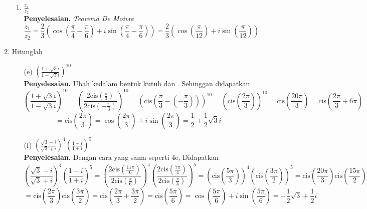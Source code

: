 \documentclass{article}
\begin{document}
\begin{enumerate}
\begin{enumerate}
        \item $\frac{z_1}{z_2}$\\
        \textbf{Penyelesaian. } \textit{Teorema De Moivre} 
        \[\frac{z_1}{z_2}=\frac{2}{3}\left(\cos{\left(\frac{\pi}{4}-\frac{\pi}{6}\right)}+i\sin{\left(\frac{\pi}{4}-\frac{\pi}{6}\right)}\right)=\frac{2}{3}\left(\cos{\left(\frac{\pi}{12}\right)}+i\sin{\left(\frac{\pi}{12}\right)}\right)\]
    \end{enumerate}

    \item Hitunglah
    \begin{enumerate}
        \item[(e)]$\left(\frac{1+\sqrt{3}i}{1-\sqrt{3}i}\right)^{10}$\\
        \textbf{Penyelesaian. } Ubah kedalam bentuk kutub   dan
        . Sehinggan didapatkan
        \[\left(\frac{1+\sqrt{3}i}{1-\sqrt{3}i}\right)^{10}=\left(\frac{2\textrm{cis}\left(\frac{\pi}{3}\right)}{2\textrm{cis}\left(-\frac{\pi}{3}\right)}\right)^{10}=\left(\textrm{cis}\left(\frac{\pi}{3}-\left(-\frac{\pi}{3}\right)\right)\right)^{10}=\left(\textrm{cis}\left(\frac{2\pi}{3}\right)\right)^{10}=\textrm{cis}\left(\frac{20\pi}{3}\right)=\textrm{cis}\left(\frac{2\pi}{3}+6\pi\right)\]
        \[=\textrm{cis}\left(\frac{2\pi}{3}\right)=\cos\left(\frac{2\pi}{3}\right)+i\sin\left(\frac{2\pi}{3}\right)=\frac{1}{2}+\frac{1}{2}\sqrt{3}i\]
        \item[(f)] $\left(\frac{\sqrt{3}-i}{\sqrt{3}+i}\right)^4\left(\frac{1-i}{1+i}\right)^5$\\
        \textbf{Penyelesaian. } Dengan cara yang sama seperti 4e, Didapatkan
        \[\left(\frac{\sqrt{3}-i}{\sqrt{3}+i}\right)^4\left(\frac{1-i}{1+i}\right)^5=\left(\frac{2\textrm{cis}\left(\frac{11\pi}{6}\right)}{2\textrm{cis}\left(\frac{\pi}{6}\right)}\right)^4\left(\frac{2\textrm{cis}\left(\frac{7\pi}{4}\right)}{2\textrm{cis}\left(\frac{\pi}{4}\right)}\right)^5=\left(\textrm{cis}\left(\frac{5\pi}{3}\right)\right)^4\left(\textrm{cis}\left(\frac{3\pi}{2}\right)\right)^5=\textrm{cis}\left(\frac{20\pi}{3}\right)\textrm{cis}\left(\frac{15\pi}{2}\right)\]
        \[=\textrm{cis}\left(\frac{2\pi}{3}\right)\textrm{cis}\left(\frac{3\pi}{2}\right)=\textrm{cis}\left(\frac{2\pi}{3}+\frac{3\pi}{2}\right)=\textrm{cis}\left(\frac{5\pi}{6}\right)=\cos\left(\frac{5\pi}{6}\right)+i\sin\left(\frac{5\pi}{6}\right)=-\frac{1}{2}\sqrt{3}+\frac{1}{2}i\]
    \end{enumerate}


\end{enumerate}
\end{document}
